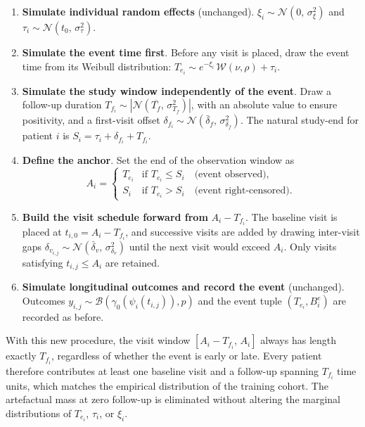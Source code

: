 \documentclass{rapportCS}
\begin{document}
\begin{enumerate}
  \item \textbf{Simulate individual random effects} (unchanged). $\xi_i \sim \mathcal{N}(0,\, \sigma_\xi^2)$ and $\tau_i \sim \mathcal{N}(t_0,\, \sigma_\tau^2)$.
  \item \textbf{Simulate the event time first}. Before any visit is placed, draw the event time from its Weibull distribution: $T_{e_i} \sim e^{-\xi_i}\, \mathcal{W}(\nu, \rho) + \tau_i$.
  \item \textbf{Simulate the study window independently of the event}. Draw a follow-up duration $T_{f_i} \sim |\mathcal{N}(\overline{T_f},\, \sigma_{T_f}^2)|$, with an absolute value to ensure positivity, and a first-visit offset $\delta_{f_i} \sim \mathcal{N}(\bar{\delta}_f,\, \sigma_{\delta_f}^2)$. The natural study-end for patient $i$ is $S_i = \tau_i + \delta_{f_i} + T_{f_i}$.
  \item \textbf{Define the anchor}. Set the end of the observation window as
  \[
    A_i = \begin{cases} T_{e_i} & \text{if } T_{e_i} \leq S_i \quad \text{(event observed),} \\ S_i & \text{if } T_{e_i} > S_i \quad \text{(event right-censored).} \end{cases}
  \]
  \item \textbf{Build the visit schedule forward from} $A_i - T_{f_i}$. The baseline visit is placed at $t_{i,0} = A_i - T_{f_i}$, and successive visits are added by drawing inter-visit gaps $\delta_{v_{i,j}} \sim \mathcal{N}(\bar{\delta}_v,\, \sigma_{\delta_v}^2)$ until the next visit would exceed $A_i$. Only visits satisfying $t_{i,j} \leq A_i$ are retained.
  \item \textbf{Simulate longitudinal outcomes and record the event} (unchanged). Outcomes $y_{i,j} \sim \mathcal{B}(\gamma_0(\psi_i(t_{i,j})), p)$ and the event tuple $(T_{e_i}, B^e_i)$ are recorded as before.
\end{enumerate}

\noindent With this new procedure, the visit window $[A_i - T_{f_i},\, A_i]$ always has length exactly $T_{f_i}$, regardless of whether the event is early or late. Every patient therefore contributes at least one baseline visit and a follow-up spanning $T_{f_i}$ time units, which matches the empirical distribution of the training cohort. The artefactual mass at zero follow-up is eliminated without altering the marginal distributions of $T_{e_i}$, $\tau_i$, or $\xi_i$.
\end{document}
